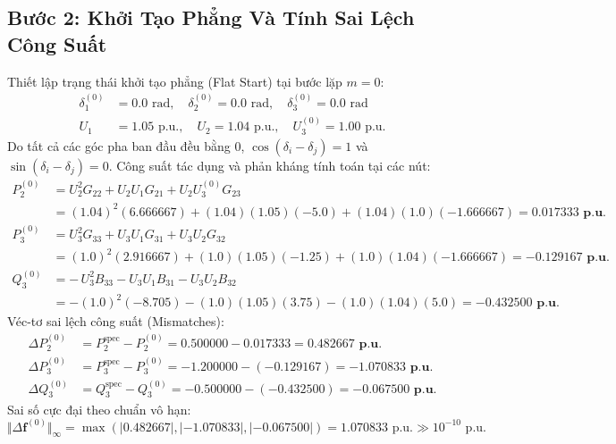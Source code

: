 \documentclass[12pt,a4paper,oneside]{report}
\begin{document}
\subsection{Bước 2: Khởi Tạo Phẳng Và Tính Sai Lệch Công Suất}
Thiết lập trạng thái khởi tạo phẳng (Flat Start) tại bước lặp $m = 0$:
\begin{align}
\delta_1^{(0)} &= 0.0\text{ rad}, \quad \delta_2^{(0)} = 0.0\text{ rad}, \quad \delta_3^{(0)} = 0.0\text{ rad} \\
U_1 &= 1.05\text{ p.u.}, \quad U_2 = 1.04\text{ p.u.}, \quad U_3^{(0)} = 1.00\text{ p.u.}
\end{align}
Do tất cả các góc pha ban đầu đều bằng $0$, $\cos(\delta_i - \delta_j) = 1$ và $\sin(\delta_i - \delta_j) = 0$. Công suất tác dụng và phản kháng tính toán tại các nút:
\begin{align}
P_2^{(0)} &= U_2^2 G_{22} + U_2 U_1 G_{21} + U_2 U_3^{(0)} G_{23} \nonumber \\
&= (1.04)^2(6.666667) + (1.04)(1.05)(-5.0) + (1.04)(1.0)(-1.666667) = \mathbf{0.017333\text{ p.u.}} \\
P_3^{(0)} &= U_3^2 G_{33} + U_3 U_1 G_{31} + U_3 U_2 G_{32} \nonumber \\
&= (1.0)^2(2.916667) + (1.0)(1.05)(-1.25) + (1.0)(1.04)(-1.666667) = \mathbf{-0.129167\text{ p.u.}} \\
Q_3^{(0)} &= -\, U_3^2 B_{33} - U_3 U_1 B_{31} - U_3 U_2 B_{32} \nonumber \\
&= -(1.0)^2(-8.705) - (1.0)(1.05)(3.75) - (1.0)(1.04)(5.0) = \mathbf{-0.432500\text{ p.u.}}
\end{align}
Véc-tơ sai lệch công suất (Mismatches):
\begin{align}
\Delta P_2^{(0)} &= P_2^{\text{spec}} - P_2^{(0)} = 0.500000 - 0.017333 = \mathbf{0.482667\text{ p.u.}} \\
\Delta P_3^{(0)} &= P_3^{\text{spec}} - P_3^{(0)} = -1.200000 - (-0.129167) = \mathbf{-1.070833\text{ p.u.}} \\
\Delta Q_3^{(0)} &= Q_3^{\text{spec}} - Q_3^{(0)} = -0.500000 - (-0.432500) = \mathbf{-0.067500\text{ p.u.}}
\end{align}
Sai số cực đại theo chuẩn vô hạn:
\begin{equation}
\Vert \Delta \mathbf{f}^{(0)} \Vert_\infty = \max(|0.482667|, |-1.070833|, |-0.067500|) = 1.070833\text{ p.u.} \gg 10^{-10}\text{ p.u.}
\end{equation}
\end{document}
